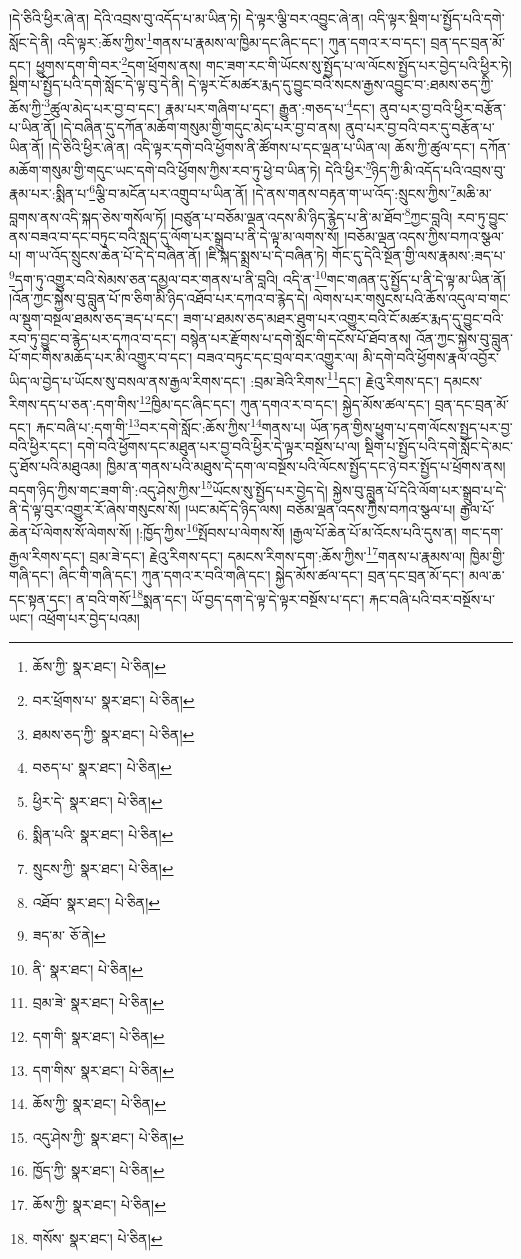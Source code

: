 །དེ་ཅིའི་ཕྱིར་ཞེ་ན། དེའི་འབྲས་བུ་འདོད་པ་མ་ཡིན་ཏེ། དེ་ལྟར་ལྕི་བར་འབྱུང་ཞེ་ན། འདི་ལྟར་སྡིག་པ་སྤྱོད་པའི་དགེ་སློང་དེ་ནི། འདི་ལྟར་:ཆོས་ཀྱིས་\footnote{ཆོས་ཀྱི་  སྣར་ཐང་།  པེ་ཅིན། }གནས་པ་རྣམས་ལ་ཁྱིམ་དང་ཞིང་དང་། ཀུན་དགའ་ར་བ་དང་། བྲན་དང་བྲན་མོ་དང་། ཕྱུགས་དག་གི་བར་\footnote{བར་ཕྲོགས་པ་  སྣར་ཐང་།  པེ་ཅིན། }དག་ཕྲོགས་ནས། གང་ཟག་རང་གི་ཡོངས་སུ་སྤྱོད་པ་ལ་ལོངས་སྤྱོད་པར་བྱེད་པའི་ཕྱིར་ཏེ། སྡིག་པ་སྤྱོད་པའི་དགེ་སློང་དེ་ལྟ་བུ་དེ་ནི། དེ་ལྟར་ངོ་མཚར་རྨད་དུ་བྱུང་བའི་སངས་རྒྱས་འབྱུང་བ་:ཐམས་ཅད་ཀྱི་ཆོས་ཀྱི་\footnote{ཐམས་ཅད་ཀྱི་  སྣར་ཐང་།  པེ་ཅིན། }ཚུལ་མེད་པར་བྱ་བ་དང་། རྣམ་པར་གཞིག་པ་དང་། རྒྱུན་:གཅད་པ་\footnote{བཅད་པ་  སྣར་ཐང་།  པེ་ཅིན། }དང་། ནུབ་པར་བྱ་བའི་ཕྱིར་བརྩོན་པ་ཡིན་ནོ། །དེ་བཞིན་དུ་དཀོན་མཆོག་གསུམ་གྱི་གདུང་མེད་པར་བྱ་བ་ནས། ནུབ་པར་བྱ་བའི་བར་དུ་བརྩོན་པ་ཡིན་ནོ། །དེ་ཅིའི་ཕྱིར་ཞེ་ན། འདི་ལྟར་དགེ་བའི་ཕྱོགས་ནི་ཚོགས་པ་དང་ལྡན་པ་ཡིན་ལ། ཆོས་ཀྱི་ཚུལ་དང་། དཀོན་མཆོག་གསུམ་གྱི་གདུང་ཡང་དགེ་བའི་ཕྱོགས་ཀྱིས་རབ་ཏུ་ཕྱེ་བ་ཡིན་ཏེ། དེའི་ཕྱིར་\footnote{ཕྱིར་དེ་  སྣར་ཐང་།  པེ་ཅིན། }ཉིད་ཀྱི་མི་འདོད་པའི་འབྲས་བུ་རྣམ་པར་:སྨིན་པ་\footnote{སྨིན་པའི་  སྣར་ཐང་།  པེ་ཅིན། }ལྕི་བ་མངོན་པར་འགྲུབ་པ་ཡིན་ནོ། །དེ་ནས་གནས་བརྟན་ག་ཡ་འོད་:སྲུངས་ཀྱིས་\footnote{སྲུངས་ཀྱི་  སྣར་ཐང་།  པེ་ཅིན། }མཆི་མ་བླགས་ནས་འདི་སྐད་ཅེས་གསོལ་ཏོ། །བཙུན་པ་བཅོམ་ལྡན་འདས་མི་ཉིད་རྙེད་པ་ནི་མ་ཐོབ་\footnote{འཐོབ་  སྣར་ཐང་།  པེ་ཅིན། }ཀྱང་བླའི། རབ་ཏུ་བྱུང་ནས་བཟའ་བ་དང་བཏུང་བའི་སླད་དུ་ལོག་པར་སྒྲུབ་པ་ནི་དེ་ལྟ་མ་ལགས་སོ། །བཅོམ་ལྡན་འདས་ཀྱིས་བཀའ་སྩལ་པ། ག་ཡ་འོད་སྲུངས་ཆེན་པོ་དེ་དེ་བཞིན་ནོ། །ཇི་སྐད་སྨྲས་པ་དེ་བཞིན་ཏེ། གོང་དུ་དེའི་སྔོན་གྱི་ལས་རྣམས་:ཟད་པ་\footnote{ཟད་མ་  ཅོ་ནེ། }དག་ཏུ་འགྱུར་བའི་སེམས་ཅན་དམྱལ་བར་གནས་པ་ནི་བླའི། འདི་ན་\footnote{ནི་  སྣར་ཐང་།  པེ་ཅིན། }གང་གཞན་དུ་སྤྱོད་པ་ནི་དེ་ལྟ་མ་ཡིན་ནོ། །འོན་ཀྱང་སྐྱེས་བུ་བླུན་པོ་ཁ་ཅིག་མི་ཉིད་འཐོབ་པར་དཀའ་བ་རྙེད་དེ། ལེགས་པར་གསུངས་པའི་ཆོས་འདུལ་བ་གང་ལ་སྡུག་བསྔལ་ཐམས་ཅད་ཟད་པ་དང་། ཟག་པ་ཐམས་ཅད་མཐར་ཐུག་པར་འགྱུར་བའི་ངོ་མཚར་རྨད་དུ་བྱུང་བའི་རབ་ཏུ་བྱུང་བ་རྙེད་པར་དཀའ་བ་དང་། བསྙེན་པར་རྫོགས་པ་དགེ་སློང་གི་དངོས་པོ་ཐོབ་ནས། འོན་ཀྱང་སྐྱེས་བུ་བླུན་པོ་གང་གིས་མཆོད་པར་མི་འགྱུར་བ་དང་། བཟའ་བཏུང་དང་བྲལ་བར་འགྱུར་ལ། མི་དགེ་བའི་ཕྱོགས་རྣལ་འབྱོར་ཡིད་ལ་བྱེད་པ་ཡོངས་སུ་བསལ་ནས་རྒྱལ་རིགས་དང་། :བྲམ་ཟེའི་རིགས་\footnote{བྲམ་ཟེ་  སྣར་ཐང་།  པེ་ཅིན། }དང་། རྗེའུ་རིགས་དང་། དམངས་རིགས་དད་པ་ཅན་:དག་གིས་\footnote{དག་གི་  སྣར་ཐང་།  པེ་ཅིན། }ཁྱིམ་དང་ཞིང་དང་། ཀུན་དགའ་ར་བ་དང་། སྐྱེད་མོས་ཚལ་དང་། བྲན་དང་བྲན་མོ་དང་། རྐང་བཞི་པ་:དག་གི་\footnote{དག་གིས་  སྣར་ཐང་།  པེ་ཅིན། }བར་དགེ་སློང་:ཆོས་ཀྱིས་\footnote{ཆོས་ཀྱི་  སྣར་ཐང་།  པེ་ཅིན། }གནས་པ། ཡོན་ཏན་གྱིས་ཕྱུག་པ་དག་ལོངས་སྤྱད་པར་བྱ་བའི་ཕྱིར་དང་། དགེ་བའི་ཕྱོགས་དང་མཐུན་པར་བྱ་བའི་ཕྱིར་དེ་ལྟར་བསྔོས་པ་ལ། སྡིག་པ་སྤྱོད་པའི་དགེ་སློང་དེ་མང་དུ་ཐོས་པའི་མཐུའམ། ཁྱིམ་ན་གནས་པའི་མཐུས་དེ་དག་ལ་བསྔོས་པའི་ལོངས་སྤྱོད་དང་ཉེ་བར་སྤྱོད་པ་ཕྲོགས་ནས། བདག་ཉིད་ཀྱིས་གང་ཟག་གི་:འདུ་ཤེས་ཀྱིས་\footnote{འདུ་ཤེས་ཀྱི་  སྣར་ཐང་།  པེ་ཅིན། }ཡོངས་སུ་སྤྱོད་པར་བྱེད་དེ། སྐྱེས་བུ་བླུན་པོ་དེའི་ལོག་པར་སྒྲུབ་པ་དེ་ནི་དེ་ལྟ་བུར་འགྱུར་རོ་ཞེས་གསུངས་སོ། །ཡང་མདོ་དེ་ཉིད་ལས། བཅོམ་ལྡན་འདས་ཀྱིས་བཀའ་སྩལ་པ། རྒྱལ་པོ་ཆེན་པོ་ལེགས་སོ་ལེགས་སོ། །:ཁྱོད་ཀྱིས་\footnote{ཁྱོད་ཀྱི་  སྣར་ཐང་།  པེ་ཅིན། }སྤོབས་པ་ལེགས་སོ། །རྒྱལ་པོ་ཆེན་པོ་མ་འོངས་པའི་དུས་ན། གང་དག་རྒྱལ་རིགས་དང་། བྲམ་ཟེ་དང་། རྗེའུ་རིགས་དང་། དམངས་རིགས་དག་:ཆོས་ཀྱིས་\footnote{ཆོས་ཀྱི་  སྣར་ཐང་།  པེ་ཅིན། }གནས་པ་རྣམས་ལ། ཁྱིམ་གྱི་གཞི་དང་། ཞིང་གི་གཞི་དང་། ཀུན་དགའ་ར་བའི་གཞི་དང་། སྐྱེད་མོས་ཚལ་དང་། བྲན་དང་བྲན་མོ་དང་། མལ་ཆ་དང་སྟན་དང་། ན་བའི་གསོ་\footnote{གསོས་  སྣར་ཐང་།  པེ་ཅིན། }སྨན་དང་། ཡོ་བྱད་དག་དེ་ལྟ་དེ་ལྟར་བསྔོས་པ་དང་། རྐང་བཞི་པའི་བར་བསྔོས་པ་ཡང་། འཕྲོག་པར་བྱེད་པའམ། 